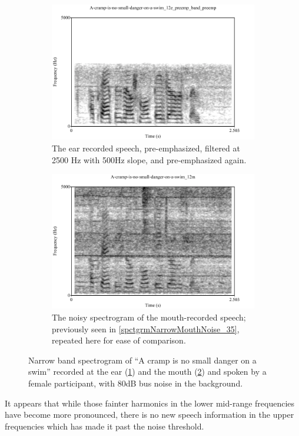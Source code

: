 \documentclass[dissertation,copyright]{uathesis}
\begin{document}
\begin{figure}[b!]
\centering
\begin{subfigure}{0.475\textwidth}
  \centering
  \includegraphics[width=1\linewidth]{figure/spctgrmNarrowEarNoisePrempFiltPremp.pdf}
  \caption{The ear recorded speech, pre-emphasized, filtered at 2500 Hz with 500Hz slope, and pre-emphasized again.}
  \label{spctgrmNarrowEarNoisePrempFiltPremp_35}
\end{subfigure}%
\hfill
\begin{subfigure}{0.475\textwidth}
  \centering
  \includegraphics[width=1\linewidth]{figure/spctgrmNarrowMthNoise_35.pdf}
  \caption{The noisy spectrogram of the mouth-recorded speech; previously seen in \ref{spctgrmNarrowMouthNoise_35}, repeated here for ease of comparison.}
  \label{spctgrmNarrowMouthNoise_35_compare}
\end{subfigure}
\caption{Narrow band spectrogram of ``A cramp is no small danger on a swim'' recorded at the ear (\ref{spctgrmNarrowEarNoisePrempFiltPremp_35}) and the mouth (\ref{spctgrmNarrowMouthNoise_35_compare}) and spoken by a female participant, with 80dB bus noise in the background.}
\label{fig:ear_pfp}
\end{figure}
It appears that while those fainter harmonics in the lower mid-range frequencies have become more pronounced, there is no new speech information in the upper frequencies which has made it past the noise threshold.
\end{document}

